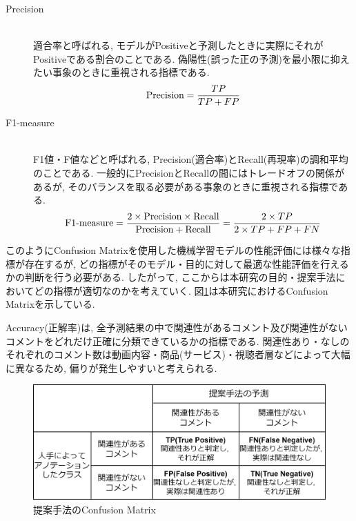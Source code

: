 \documentclass{ltjarticle}
\begin{document}
\begin{description}
    \item[Precision]\mbox{}\\
    適合率と呼ばれる, モデルがPositiveと予測したときに実際にそれがPositiveである割合のことである. 
    偽陽性(誤った正の予測)を最小限に抑えたい事象のときに重視される指標である. \\
    \begin{equation}
        \textrm{Precision} = \dfrac{TP}{TP+FP}\notag
    \end{equation}
    \vspace{5truept}

    \item[F1-measure]\mbox{}\\
    F1値・F値などと呼ばれる, Precision(適合率)とRecall(再現率)の調和平均のことである. 
    一般的にPrecisionとRecallの間にはトレードオフの関係があるが, そのバランスを取る必要がある事象のときに重視される指標である. \\
    \begin{equation}
        \textrm{F1-measure} = \dfrac{2\times \textrm{Precision}\times \textrm{Recall}}{\textrm{Precision}+\textrm{Recall}} = \dfrac{2\times TP}{2\times TP+FP+FN}\notag
    \end{equation}
    \vspace{5truept}

\end{description}

このようにConfusion Matrixを使用した機械学習モデルの性能評価には様々な指標が存在するが, 
どの指標がそのモデル・目的に対して最適な性能評価を行えるかの判断を行う必要がある. 
したがって, ここからは本研究の目的・提案手法においてどの指標が適切なのかを考えていく. 
図\ref{fig:提案手法のconfusion}は本研究におけるConfusion Matrixを示している. 

Accuracy(正解率)は, 全予測結果の中で関連性があるコメント及び関連性がないコメントをどれだけ正確に分類できているかの指標である. 
関連性あり・なしのそれぞれのコメント数は動画内容・商品(サービス)・視聴者層などによって大幅に異なるため, 
偏りが発生しやすいと考えられる. 
\vspace{3truept}

\begin{figure}[ht]
    \centering
    \includegraphics[width = 12cm]{images/提案手法のconfusion.drawio.png}
    \caption{提案手法のConfusion Matrix}
    \label{fig:提案手法のconfusion}
\end{figure}
\vspace{5truept}
\end{document}

